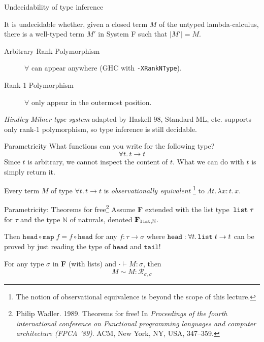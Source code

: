 \begin{frame}{Undecidability of type inference}
  \begin{theorem}
     It is undecidable whether, given a closed term $M$ of the untyped
     lambda-calculus, there is a well-typed term $M'$ in System F such that
     $|M'| = M$.  
  \end{theorem}

  \begin{description}
    \item[Arbitrary Rank Polymorphism] $\forall$ can appear
      anywhere {\small (GHC with \texttt{-XRankNType})}. 
    \item[Rank-1 Polymorphism]
      $\forall$ only appear in the outermost position.
  \end{description}
  \emph{Hindley-Milner type system} adapted by Haskell 98, Standard ML, etc.
  supports only rank-1 polymorphism, so type inference is still decidable.
\end{frame}

\begin{frame}{Parametricity}
  What functions can you write for the following type?
  \[
    \forall t.\,t \to t 
  \]
  Since $t$ is arbitrary, we cannot inspect the content of $t$. What we can do
  with $t$ is simply return it.
  \begin{theorem}
    Every term $M$ of type $\forall t.\, t \to t$ is \emph{observationally equivalent}%
    \footnote{The notion of observational equivalence is beyond the scope of this lecture.}
      to $\Lambda t.\, \lambda x : t.\, x$. 
  \end{theorem}
\end{frame}

\begin{frame}{Parametricity: Theorems for free\footnote{Philip Wadler. 1989. Theorems for free! In \emph{Proceedings of the fourth international conference on Functional programming languages and computer architecture (FPCA ’89)}. ACM, New York, NY, USA, 347–359.}}
  Assume \textbf{F} extended with the list type~$\mathtt{list}\;\tau$ for $\tau$ and
  the type $\mathbb{N}$ of naturals, denoted $\mathbf{F}_{\mathtt{list}, \mathbb{N}}$.

  Then $\mathtt{head} \circ \mathtt{map}\; f = f \circ \mathtt{head}$
      for any $f : \tau \to \sigma$ where $\mathtt{head} : \forall t.\, \mathtt{list}\;t \to t$
  can be proved by just reading the type of $\mathtt{head}$ and $\mathtt{tail}$!
  \begin{theorem}
    For any type $\sigma$ in \textbf{F} (with lists) and $\cdot  \vdash M : \sigma$, then 
    \[
      M \sim M : \mathcal{R}_{\sigma, \sigma}
    \]
  \end{theorem}
\end{frame}

